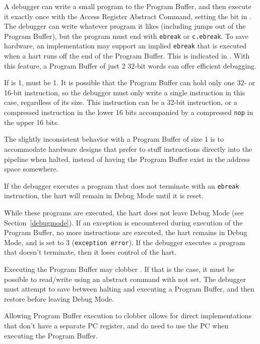 A debugger can write a small program to the Program Buffer, and then
execute it exactly once with the Access Register Abstract Command,
setting the \Fpostexec bit in \Rcommand.
The debugger can write whatever program it likes (including jumps out of the
Program Buffer), but the program must end with
{\tt ebreak} or {\tt c.ebreak}. To save hardware, an implementation may support
an implied {\tt ebreak} that is executed when a hart runs off the end of the
Program Buffer. This is indicated in \Fimpebreak. With this feature, a Program
Buffer of just 2 32-bit words can offer efficient debugging.

If \Fprogbufsize is 1, \Fimpebreak must be 1. It is possible that the Program
Buffer can hold only one 32- or 16-bit instruction, so the debugger must only
write a single instruction in this case, regardless of its size.
This instruction can be a 32-bit
instruction, or a compressed instruction in the lower 16 bits accompanied by a
compressed {\tt nop} in the upper 16 bits.

\begin{commentary}
    The slightly inconsistent behavior with a Program Buffer of size 1 is to
    accommodate hardware designs that prefer to stuff instructions directly
    into the pipeline when halted, instead of having the Program Buffer exist
    in the address space somewhere.
\end{commentary}

If the debugger executes a program that does not
terminate with an {\tt ebreak} instruction, the hart will remain in Debug Mode
until it is reset.

While these programs are executed, the hart does not leave Debug Mode (see
Section~\ref{debugmode}).  If an exception is encountered during execution of
the Program Buffer, no more instructions are executed, the hart remains in Debug
Mode, and \Fcmderr is set to 3 ({\tt exception error}).  If the debugger
executes a program that doesn't terminate, then it loses control of the hart.

Executing the Program Buffer may clobber \Rdpc. If that is the case, it must be
possible to read/write \Rdpc using an abstract command with \Fpostexec not set.
The debugger must attempt to save \Rdpc between halting and
executing a Program Buffer, and then restore \Rdpc before leaving Debug Mode.

\begin{commentary}
    Allowing Program Buffer execution to clobber \Rdpc allows for direct
    implementations that don't have a separate PC register, and do need to use
    the PC when executing the Program Buffer.
\end{commentary}

